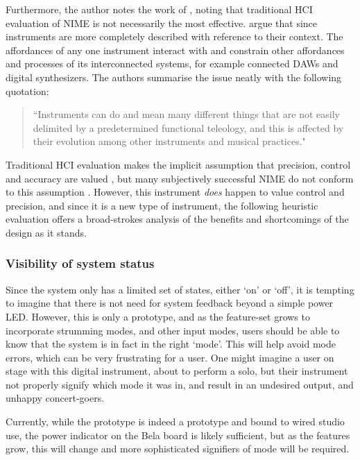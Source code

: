 Furthermore, the author notes the work of \cite{rodger_what_2020}, noting that traditional HCI evaluation of NIME is not necessarily the most effective. \cite{rodger_what_2020} argue that since instruments are more completely described with reference to their context. The affordances of any one instrument interact with and constrain other affordances and processes of its interconnected systems, for example connected DAWs and digital synthesizers. The authors summarise the issue neatly with the following quotation:

\begin{quote}
    ``Instruments can do and mean many different things that are not easily delimited by a predetermined functional teleology, and this is affected by their evolution among other instruments and musical practices." \\ 
    \hspace*{\fill} \textit{\cite{rodger_what_2020}}
\end{quote}

Traditional HCI evaluation makes the implicit assumption that precision, control and accuracy are valued \cite{rodger_what_2020}, but many subjectively successful NIME do not conform to this assumption \cite{gurevich_expression_2007}. However, this instrument \textit{does} happen to value control and precision, and since it is a new type of instrument, the following heuristic evaluation offers a broad-strokes analysis of the benefits and shortcomings of the design as it stands. 

\subsubsection{Visibility of system status}
Since the system only has a limited set of states, either `on' or `off', it is tempting to imagine that there is not need for system feedback beyond a simple power LED. However, this is only a prototype, and as the feature-set grows to incorporate strumming modes, and other input modes, users should be able to know that the system is in fact in the right `mode'. This will help avoid mode errors, which can be very frustrating for a user. One might imagine a user on stage with this digital instrument, about to perform a solo, but their instrument not properly signify which mode it was in, and result in an undesired output, and unhappy concert-goers. 

Currently, while the prototype is indeed a prototype and bound to wired studio use, the power indicator on the Bela board is likely sufficient, but as the features grow, this will change and more sophisticated signifiers of mode will be required.



